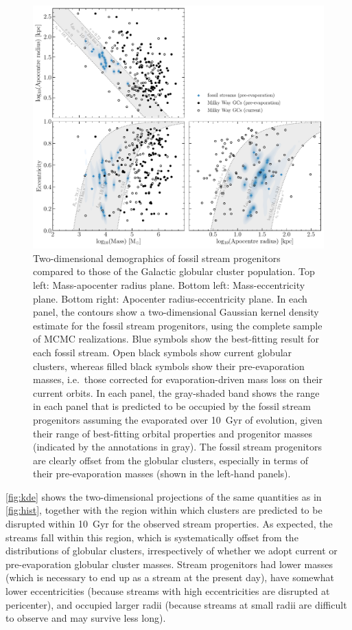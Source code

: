 \documentclass[twocolumn]{aastex63}
\begin{document}
\begin{figure}
\includegraphics[width=\hsize]{figures/distributions_2d_mc.pdf}%
\caption{
\label{fig:kde}
Two-dimensional demographics of fossil stream progenitors compared to those of the Galactic globular cluster population. Top left: Mass-apocenter radius plane. Bottom left: Mass-eccentricity plane. Bottom right: Apocenter radius-eccentricity plane. In each panel, the contours show a two-dimensional Gaussian kernel density estimate for the fossil stream progenitors, using the complete sample of MCMC realizations. Blue symbols show the best-fitting result for each fossil stream. Open black symbols show current globular clusters, whereas filled black symbols show their pre-evaporation masses, i.e.\ those corrected for evaporation-driven mass loss on their current orbits. In each panel, the gray-shaded band shows the range in each panel that is predicted to be occupied by the fossil stream progenitors assuming the evaporated over 10~Gyr of evolution, given their range of best-fitting orbital properties and progenitor masses (indicated by the annotations in gray). The fossil stream progenitors are clearly offset from the globular clusters, especially in terms of their pre-evaporation masses (shown in the left-hand panels).}
\end{figure}

\autoref{fig:kde} shows the two-dimensional projections of the same quantities as in \autoref{fig:hist}, together with the region within which clusters are predicted to be disrupted within 10~Gyr for the observed stream properties.
As expected, the streams fall within this region, which is systematically offset from the distributions of globular clusters, irrespectively of whether we adopt current or pre-evaporation globular cluster masses.
Stream progenitors had lower masses (which is necessary to end up as a stream at the present day), have somewhat lower eccentricities (because streams with high eccentricities are disrupted at pericenter), and occupied larger radii (because streams at small radii are difficult to observe and may survive less long).
\end{document}
